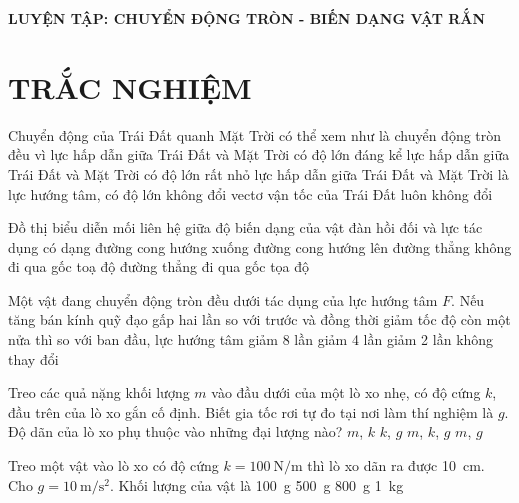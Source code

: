 \begin{center}
	\textbf{LUYỆN TẬP: CHUYỂN ĐỘNG TRÒN - BIẾN DẠNG VẬT RẮN}
\end{center}
\section{TRẮC NGHIỆM}
\begin{ex}
	Chuyển động của Trái Đất quanh Mặt Trời có thể xem như là chuyển động tròn đều vì
	\choice
	{lực hấp dẫn giữa Trái Đất và Mặt Trời có độ lớn đáng kể}
	{lực hấp dẫn giữa Trái Đất và Mặt Trời có độ lớn rất nhỏ}
	{\True lực hấp dẫn giữa Trái Đất và Mặt Trời là lực hướng tâm, có độ lớn không đổi}
	{vectơ vận tốc của Trái Đất luôn không đổi}
	\loigiai{}
\end{ex}
\begin{ex}
	Đồ thị biểu diễn mối liên hệ giữa độ biến dạng của vật đàn hồi đối và lực tác dụng có dạng
	\choice
	{đường cong hướng xuống}
	{đường cong hướng lên}
	{đường thẳng không đi qua gốc toạ độ}
	{\True đường thẳng đi qua gốc tọa độ}
	\loigiai{}
\end{ex}
\begin{ex}
	Một vật đang chuyển động tròn đều dưới tác dụng của lực hướng tâm $F$. Nếu tăng bán kính quỹ đạo gấp hai lần so với trước và đồng thời giảm tốc độ còn một nửa thì so với ban đầu, lực hướng tâm
	\choice
	{giảm 8 lần}
	{giảm 4 lần}
	{giảm 2 lần}
	{không thay đổi}
	\loigiai{}
\end{ex}
\begin{ex}
	Treo các quả nặng khối lượng $m$ vào đầu dưới của một lò xo nhẹ, có độ cứng $k$, đầu trên của lò xo gắn cố định. Biết gia tốc rơi tự đo tại nơi làm thí nghiệm là $g$. Độ dãn của lò xo phụ thuộc vào những đại lượng nào?
	\choice
	{$m$, $k$}
	{$k$, $g$}
	{$m$, $k$, $g$}
	{$m$, $g$}
	\loigiai{}
\end{ex}
\begin{ex}
	Treo một vật vào lò xo có độ cứng $k=\SI{100}{\newton/\meter}$ thì lò xo dãn ra được \SI{10}{\centi\meter}. Cho $g=\SI{10}{\meter/\second^2}$. Khối lượng của vật là
	\choice
	{\SI{100}{\gram}}
	{\SI{500}{\gram}}
	{\SI{800}{\gram}}
	{\SI{1}{\kilogram}}
	\loigiai{}
\end{ex}
